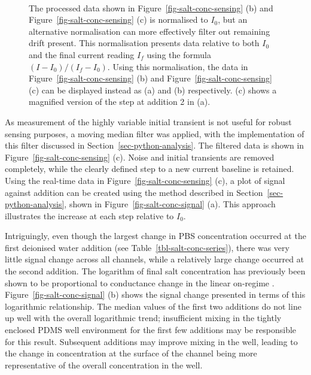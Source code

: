 \documentclass[
  a4paper,
]{scrbook}
\begin{document}
\begin{figure}
\begin{minipage}[t]{0.70\linewidth}
{{}

}

\end{minipage}%
%
\begin{minipage}[t]{0.15\linewidth}

{\centering 

~

}

\end{minipage}%

\caption[Salt concentration sensing series presented using an
alternative normalisation approach.]{\label{fig-salt-conc-sensing-2}The
processed data shown in Figure~\ref{fig-salt-conc-sensing} (b) and
Figure~\ref{fig-salt-conc-sensing} (c) is normalised to \(I_{0}\), but
an alternative normalisation can more effectively filter out remaining
drift present. This normalisation presents data relative to both
\(I_{0}\) and the final current reading \(I_{f}\) using the formula
\((I - I_0)/(I_f - I_0)\). Using this normalisation, the data in
Figure~\ref{fig-salt-conc-sensing} (b) and
Figure~\ref{fig-salt-conc-sensing} (c) can be displayed instead as (a)
and (b) respectively. (c) shows a magnified version of the step at
addition 2 in (a).}

\end{figure}

As measurement of the highly variable initial transient is not useful
for robust sensing purposes, a moving median filter was applied, with
the implementation of this filter discussed in
Section~\ref{sec-python-analysis}. The filtered data is shown in
Figure~\ref{fig-salt-conc-sensing} (c). Noise and initial transients are
removed completely, while the clearly defined step to a new current
baseline is retained. Using the real-time data in
Figure~\ref{fig-salt-conc-sensing} (c), a plot of signal against
addition can be created using the method described in
Section~\ref{sec-python-analysis}, shown in
Figure~\ref{fig-salt-conc-signal} (a). This approach illustrates the
increase at each step relative to \(I_{0}\).

Intriguingly, even though the largest change in PBS concentration
occurred at the first deionised water addition (see
Table~\ref{tbl-salt-conc-series}), there was very little signal change
across all channels, while a relatively large change occurred at the
second addition. The logarithm of final salt concentration has
previously been shown to be proportional to conductance change in the
linear on-regime \autocite{Heller2010}.
Figure~\ref{fig-salt-conc-signal} (b) shows the signal change presented
in terms of this logarithmic relationship. The median values of the
first two additions do not line up well with the overall logarithmic
trend; insufficient mixing in the tightly enclosed PDMS well environment
for the first few additions may be responsible for this result.
Subsequent additions may improve mixing in the well, leading to the
change in concentration at the surface of the channel being more
representative of the overall concentration in the well.
\end{document}

